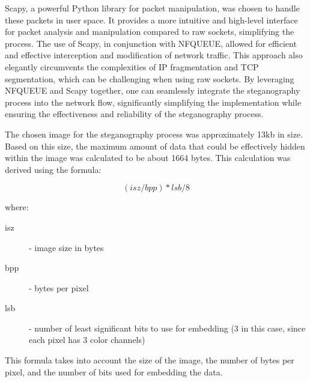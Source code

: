 \documentclass[12pt, fleqn, a4paper]{article}
\begin{document}
Scapy, a powerful Python library for packet manipulation, was chosen to handle these packets in user space. It provides a more intuitive and high-level interface for packet analysis and manipulation compared to raw sockets, simplifying the process. The use of Scapy, in conjunction with NFQUEUE, allowed for efficient and effective interception and modification of network traffic. This approach also elegantly circumvents the complexities of IP fragmentation and TCP segmentation, which can be challenging when using raw sockets. By leveraging NFQUEUE and Scapy together, one can seamlessly integrate the steganography process into the network flow, significantly simplifying the implementation while ensuring the effectiveness and reliability of the steganography process.

The chosen image for the steganography process was approximately 13kb in size. Based on this size, the maximum amount of data that could be effectively hidden within the image was calculated to be about 1664 bytes. This calculation was derived using the formula:
\begin{ceqn}
\begin{equation}
(isz / bpp) * lsb / 8
\end{equation}
\end{ceqn}
where:
\begin{description}
  \item [isz] - image size in bytes
  \item [bpp] - bytes per pixel
  \item[lsb] - number of least significant bits to use for embedding (3 in this case, since each pixel has 3 color channels)
\end{description}
This formula takes into account the size of the image, the number of bytes per pixel, and the number of bits used for embedding the data.
\end{document}
